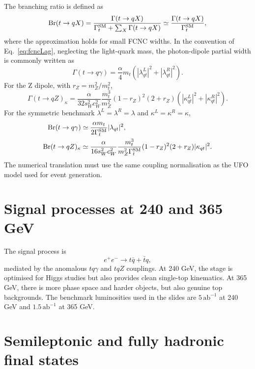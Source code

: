 \documentclass[11pt,a4paper]{report}
\newcommand{\ee}{e^+e^-}
\newcommand{\br}{\mathrm{Br}}
\newcommand{\abinv}{\,\mathrm{ab}^{-1}}
\begin{document}
The branching ratio is defined as
\begin{equation}
  \br(t\to qX)=\frac{\Gamma(t\to qX)}{\Gamma_t^{\rm SM}+\sum_X\Gamma(t\to qX)}
  \simeq\frac{\Gamma(t\to qX)}{\Gamma_t^{\rm SM}},
\end{equation}
where the approximation holds for small FCNC widths.  In the convention of Eq.~\eqref{eq:fcncLag}, neglecting the light-quark mass, the photon-dipole partial width is commonly written as
\begin{equation}
  \Gamma(t\to q\gamma)=\frac{\alpha}{4}m_t\left(|\lambda^L_{qt}|^2+|\lambda^R_{qt}|^2\right).
\end{equation}
For the Z dipole, with $r_Z=m_Z^2/m_t^2$,
\begin{equation}
  \Gamma(t\to qZ)_\kappa=\frac{\alpha}{32s_W^2c_W^2}\frac{m_t^3}{m_Z^2}(1-r_Z)^2(2+r_Z)
  \left(|\kappa^L_{qt}|^2+|\kappa^R_{qt}|^2\right).
\end{equation}
For the symmetric benchmark $\lambda^L=\lambda^R=\lambda$ and $\kappa^L=\kappa^R=\kappa$,
\begin{align}
  \br(t\to q\gamma)&\simeq\frac{\alpha m_t}{2\Gamma_t^{\rm SM}}|\lambda_{qt}|^2,\\
  \br(t\to qZ)_\kappa&\simeq\frac{\alpha}{16s_W^2c_W^2}\frac{m_t^3}{m_Z^2\Gamma_t^{\rm SM}}(1-r_Z)^2(2+r_Z)|\kappa_{qt}|^2.
\end{align}
The numerical translation must use the same coupling normalisation as the UFO model used for event generation.

\section{Signal processes at 240 and 365 GeV}

The signal process is
\begin{equation}
  \ee\to t\bar q+\bar t q,
\end{equation}
mediated by the anomalous $tq\gamma$ and $tqZ$ couplings.  At 240 GeV, the stage is optimised for Higgs studies but also provides clean single-top kinematics.  At 365 GeV, there is more phase space and harder objects, but also genuine top backgrounds.  The benchmark luminosities used in the slides are $5\abinv$ at 240 GeV and $1.5\abinv$ at 365 GeV.

\section{Semileptonic and fully hadronic final states}
\end{document}

